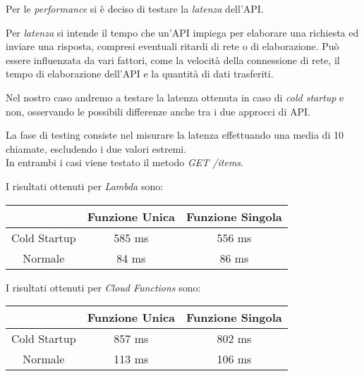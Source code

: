 Per le \textit{performance} si è deciso di testare la \textit{latenza} dell'API.

Per \textit{latenza} si intende il tempo che un'API impiega per elaborare una richiesta ed inviare una risposta, compresi eventuali ritardi di rete o di elaborazione. Può essere influenzata da vari fattori, come la velocità della connessione di rete, il tempo di elaborazione dell'API e la quantità di dati trasferiti.

Nel nostro caso andremo a testare la latenza ottenuta in caso di \textit{cold startup} e non, osservando le possibili differenze anche tra i due approcci di API.

La fase di testing consiste nel misurare la latenza effettuando una media di 10 chiamate, escludendo i due valori estremi.\\
In entrambi i casi viene testato il metodo \textit{GET /items}.

I risultati ottenuti per \textit{Lambda} sono:
\begin{table}[H]
    \centering
    \begin{tabular}{|c|c|c|}
    \hline
        \textbf{} & \textbf{Funzione Unica} & \textbf{Funzione Singola} \\ \hline
        Cold Startup & 585 ms & 556 ms \\ \hline
        Normale & 84 ms & 86 ms \\ \hline
    \end{tabular}
\end{table}

I risultati ottenuti per \textit{Cloud Functions} sono:
\begin{table}[H]
    \centering
    \begin{tabular}{|c|c|c|}
    \hline
        \textbf{} & \textbf{Funzione Unica} & \textbf{Funzione Singola} \\ \hline
        Cold Startup & 857 ms & 802 ms \\ \hline
        Normale & 113 ms & 106 ms \\ \hline
    \end{tabular}
\end{table}